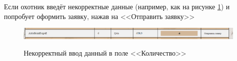 	Если охотник введёт некорректные данные (например, как на рисунке \ref{fig12:image}) и попробует оформить заявку, нажав на <<Отправить заявку>>
	
	\begin{figure}[h]
		\centering
		\begin{center}
			{\includegraphics[scale=0.34]{schemes/screens/wrong_num.png}}
			\caption{Некорректный ввод данный в поле <<Количество>>}
			\label{fig12:image}
		\end{center}
	\end{figure}
	
		
		 
		
	